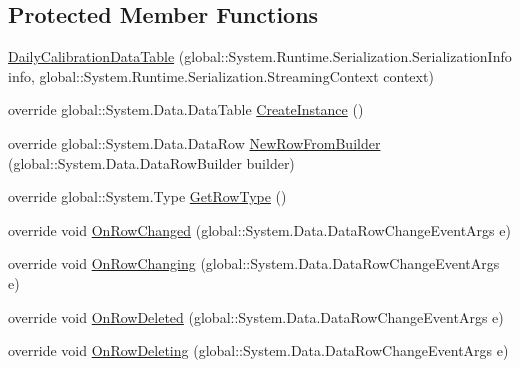 \subsection*{Protected Member Functions}
\begin{DoxyCompactItemize}
\item 
\hyperlink{class_env_int_1_1_win32_1_1_field_tech_1_1_manager_1_1_data_sets_1_1_guide_ware_mobile_data_set_5b380d875f3f569d74f6183f0c2ee8d7_af63fac12642aa3387edd7a908f8cfed6}{Daily\+Calibration\+Data\+Table} (global\+::\+System.\+Runtime.\+Serialization.\+Serialization\+Info info, global\+::\+System.\+Runtime.\+Serialization.\+Streaming\+Context context)
\item 
override global\+::\+System.\+Data.\+Data\+Table \hyperlink{class_env_int_1_1_win32_1_1_field_tech_1_1_manager_1_1_data_sets_1_1_guide_ware_mobile_data_set_5b380d875f3f569d74f6183f0c2ee8d7_a6017a8fe58bf41b26e95ccf095791865}{Create\+Instance} ()
\item 
override global\+::\+System.\+Data.\+Data\+Row \hyperlink{class_env_int_1_1_win32_1_1_field_tech_1_1_manager_1_1_data_sets_1_1_guide_ware_mobile_data_set_5b380d875f3f569d74f6183f0c2ee8d7_af392db4a8cd589d1bf5202e04f9ef907}{New\+Row\+From\+Builder} (global\+::\+System.\+Data.\+Data\+Row\+Builder builder)
\item 
override global\+::\+System.\+Type \hyperlink{class_env_int_1_1_win32_1_1_field_tech_1_1_manager_1_1_data_sets_1_1_guide_ware_mobile_data_set_5b380d875f3f569d74f6183f0c2ee8d7_adeeffed383450f0568e97d829f443ae0}{Get\+Row\+Type} ()
\item 
override void \hyperlink{class_env_int_1_1_win32_1_1_field_tech_1_1_manager_1_1_data_sets_1_1_guide_ware_mobile_data_set_5b380d875f3f569d74f6183f0c2ee8d7_a107dad9310b57f8f496cb9d81d4bdd1a}{On\+Row\+Changed} (global\+::\+System.\+Data.\+Data\+Row\+Change\+Event\+Args e)
\item 
override void \hyperlink{class_env_int_1_1_win32_1_1_field_tech_1_1_manager_1_1_data_sets_1_1_guide_ware_mobile_data_set_5b380d875f3f569d74f6183f0c2ee8d7_a66250d57ed7f2bb7792a9da90d1337fe}{On\+Row\+Changing} (global\+::\+System.\+Data.\+Data\+Row\+Change\+Event\+Args e)
\item 
override void \hyperlink{class_env_int_1_1_win32_1_1_field_tech_1_1_manager_1_1_data_sets_1_1_guide_ware_mobile_data_set_5b380d875f3f569d74f6183f0c2ee8d7_a208ff57a84a3cb9a324916cb1f297831}{On\+Row\+Deleted} (global\+::\+System.\+Data.\+Data\+Row\+Change\+Event\+Args e)
\item 
override void \hyperlink{class_env_int_1_1_win32_1_1_field_tech_1_1_manager_1_1_data_sets_1_1_guide_ware_mobile_data_set_5b380d875f3f569d74f6183f0c2ee8d7_a3ef54fb6f1859c619e22114247737e84}{On\+Row\+Deleting} (global\+::\+System.\+Data.\+Data\+Row\+Change\+Event\+Args e)

\end{DoxyCompactItemize}

